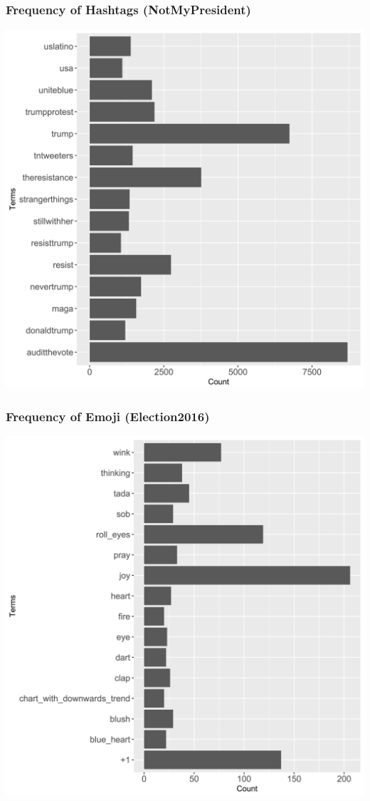 \documentclass{beamer}
\begin{document}
\begin{frame}
	\frametitle{Frequency of Hashtags (NotMyPresident)}
  \includegraphics[height = 0.9\textheight]{nmphashcount}
\end{frame}

\begin{frame}
	\frametitle{Frequency of Emoji (Election2016)}
  \includegraphics[height = 0.9\textheight]{e2016emoji}
\end{frame}
\end{document}

